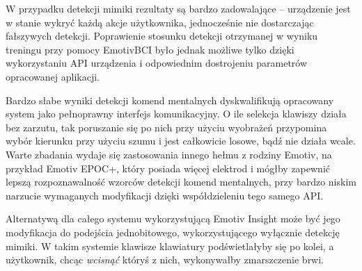 \documentclass[skorowidz,skroty]{dyplomWEZUT}
\begin{document}
W przypadku detekcji mimiki rezultaty są bardzo zadowalające -- urządzenie jest w stanie wykryć każdą akcje użytkownika, jednocześnie nie dostarczając fałszywych detekcji. Poprawienie stosunku detekcji otrzymanej w wyniku treningu przy pomocy EmotivBCI było jednak możliwe tylko dzięki wykorzystaniu API urządzenia i odpowiednim dostrojeniu parametrów opracowanej aplikacji. 

Bardzo słabe wyniki detekcji komend mentalnych dyskwalifikują opracowany system jako pełnoprawny interfejs komunikacyjny. O ile selekcja klawiszy działa bez zarzutu, tak poruszanie się po nich przy użyciu wyobrażeń przypomina wybór kierunku przy użyciu szumu i jest całkowicie losowe, bądź nie działa wcale. Warte zbadania wydaje się zastosowania innego hełmu z rodziny Emotiv, na przykład Emotiv EPOC+, który posiada więcej elektrod i mógłby zapewnić lepszą rozpoznawalność wzorców detekcji komend mentalnych, przy bardzo niskim narzucie wymaganych modyfikacji dzięki współdzieleniu tego samego API.

Alternatywą dla całego systemu wykorzystującą Emotiv Insight może być jego modyfikacja do podejścia jednobitowego, wykorzystującego wyłącznie detekcję mimiki. W takim systemie klawisze klawiatury podświetlałyby się po kolei, a użytkownik, chcąc \textit{wcisnąć} któryś z nich, wykonywałby zmarszczenie brwi.
\end{document}

